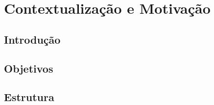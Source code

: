 \chapter{Contextualização e Motivação}

\section{Introdução}

\section{Objetivos}

\section{Estrutura}